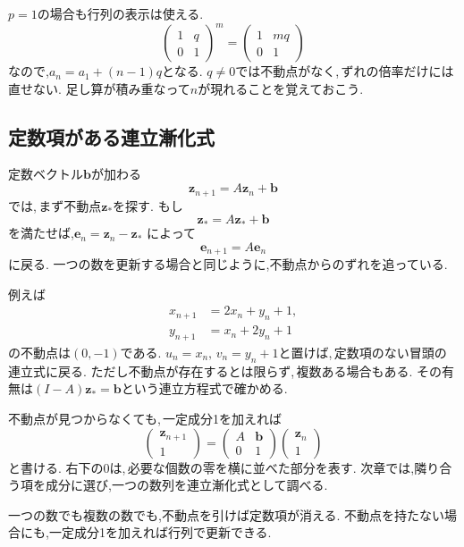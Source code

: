 $p=1$の場合も行列の表示は使える.
\[
 \begin{pmatrix}1&q\\0&1\end{pmatrix}^{m}
 =\begin{pmatrix}1&mq\\0&1\end{pmatrix}
\]
なので,$a_n=a_1+(n-1)q$となる.
$q\ne0$では不動点がなく,\,ずれの倍率だけには直せない.
足し算が積み重なって$n$が現れることを覚えておこう.

\subsection{定数項がある連立漸化式}

定数ベクトル$\boldsymbol b$が加わる
\[
 \boldsymbol z_{n+1}=A\boldsymbol z_n+\boldsymbol b
\]
では,\,まず不動点$\boldsymbol z_*$を探す.
もし
\[
 \boldsymbol z_*=A\boldsymbol z_*+\boldsymbol b
\]
を満たせば,$\boldsymbol e_n=\boldsymbol z_n-\boldsymbol z_*$
によって
\[
 \boldsymbol e_{n+1}=A\boldsymbol e_n
\]
に戻る. 一つの数を更新する場合と同じように,不動点からのずれを追っている.

例えば
\[
 \begin{aligned}
 x_{n+1}&=2x_n+y_n+1,\\
 y_{n+1}&=x_n+2y_n+1
 \end{aligned}
\]
の不動点は$(0,-1)$である.
$u_n=x_n,\,v_n=y_n+1$と置けば,\,定数項のない冒頭の連立式に戻る.
ただし不動点が存在するとは限らず,\,複数ある場合もある.
その有無は$(I-A)\boldsymbol z_*=\boldsymbol b$という連立方程式で確かめる.

不動点が見つからなくても,\,一定成分1を加えれば
\[
 \begin{pmatrix}\boldsymbol z_{n+1}\\1\end{pmatrix}
 =
 \begin{pmatrix}A&\boldsymbol b\\0&1\end{pmatrix}
 \begin{pmatrix}\boldsymbol z_n\\1\end{pmatrix}
\]
と書ける. 右下の0は,\,必要な個数の零を横に並べた部分を表す.
次章では,隣り合う項を成分に選び,一つの数列を連立漸化式として調べる.


\begin{bookpoint}
一つの数でも複数の数でも,不動点を引けば定数項が消える.
不動点を持たない場合にも,一定成分1を加えれば行列で更新できる.
\end{bookpoint}
